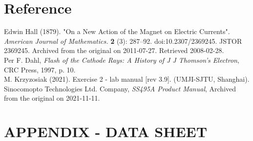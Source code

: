 \documentclass[a4paper]{article}
\begin{document}
\newpage
\section{Reference}
\noindent [1] Edwin Hall (1879). "On a New Action of the Magnet on Electric Currents". \textit{American Journal of Mathematics.} \textbf{2} (3): 287–92. doi:10.2307/2369245. JSTOR 2369245.
Archived from the original on 2011-07-27. Retrieved 2008-02-28. \\
\noindent [2] Per F. Dahl, \textit{Flash of the Cathode Rays: A History of J J Thomson's Electron}, CRC Press, 1997, p. 10. \\
\noindent [3] M. Krzyzosiak (2021). Exercise 2 - lab manual [rev 3.9]. (UMJI-SJTU, Shanghai). \\ 
\noindent [4] Sinocomopto Technologies Ltd. Company, \textit{SS495A Product Manual}, Archived from the original on 2021-11-11.


\newpage
\section*{APPENDIX - DATA SHEET}




\end{document}
